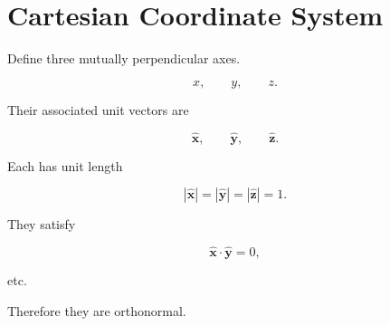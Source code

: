 \section{Cartesian Coordinate System}

Define three mutually perpendicular axes.

\[
x,
\qquad
y,
\qquad
z.
\]

Their associated unit vectors are

\[
\hat{\mathbf x},
\qquad
\hat{\mathbf y},
\qquad
\hat{\mathbf z}.
\]

Each has unit length

\[
|\hat{\mathbf x}|=
|\hat{\mathbf y}|=
|\hat{\mathbf z}|=1.
\]

They satisfy

\[
\hat{\mathbf x}\cdot\hat{\mathbf y}=0,
\]

etc.

Therefore they are orthonormal.

